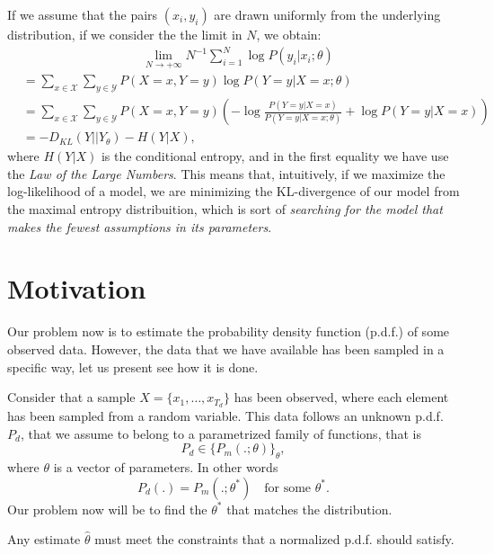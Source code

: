 \begin{remark}
If we assume that the pairs $(x_i,y_i)$ are drawn uniformly from the underlying distribution, if we consider the the limit in $N$, we obtain:
\begin{align*}
    &\hspace{4cm} \lim_{N \to + \infty} N^{-1}\sum_{i=1}^N \log P(y_i|x_i;\theta) \\
    &  = \sum_{x\in \mathcal X}\sum_{y \in \mathcal Y} P(X = x,Y = y) \log P(Y = y | X = x; \theta)\\
    & = \sum_{x\in \mathcal X}\sum_{y \in \mathcal Y} P(X = x,Y = y) \left( - \log \frac{P(Y = y | X = x)}{P(Y = y | X = x; \theta)} + \log P(Y = y | X = x) \right) \\
    & = - D_{KL}(Y || Y_\theta) - H(Y|X),
\end{align*}
where $H(Y|X)$ is the conditional entropy\footnotemark, and in the first equality we have use the \emph{Law of the Large Numbers}. This means that, intuitively, if we maximize the log-likelihood of a model, we are minimizing the KL-divergence of our model from the maximal entropy distribuition, which is sort of \emph{searching for the model that makes the fewest assumptions in its parameters}.
\end{remark}



 


\section{Motivation}

Our problem now is to estimate the probability density function (p.d.f.) of some observed data. However, the data that we have available has been sampled in a specific way, let us present see how it is done.

Consider that a sample $X = \{x_1,\dots,x_{T_d}\}$  has been observed, where each element has been sampled from a random variable. This data follows an unknown p.d.f. $P_d$, that we assume to belong to a parametrized family of functions, that is
\[
P_d \in \{P_m(.;\theta)\}_\theta,
\]
where $\theta$ is a vector of parameters. In other words
$$
P_d(.) = P_m(.;\theta^*) \quad \text{for some } \theta^*.
$$
Our problem now will be to find the $\theta^*$ that matches the distribution. 

Any estimate $\hat{\theta}$ must meet the constraints that a normalized p.d.f. should satisfy.


